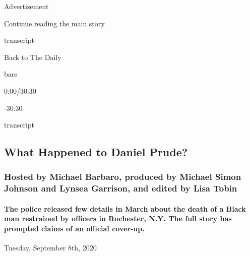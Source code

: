 Advertisement

\protect\hyperlink{after-top}{Continue reading the main story}

transcript

Back to The Daily

bars

0:00/30:30

-30:30

transcript

\hypertarget{what-happened-to-daniel-prude}{%
\subsection{What Happened to Daniel
Prude?}\label{what-happened-to-daniel-prude}}

\hypertarget{hosted-by-michael-barbaro-produced-by-michael-simon-johnson-and-lynsea-garrison-and-edited-by-lisa-tobin}{%
\subsubsection{Hosted by Michael Barbaro, produced by Michael Simon
Johnson and Lynsea Garrison, and edited by Lisa
Tobin}\label{hosted-by-michael-barbaro-produced-by-michael-simon-johnson-and-lynsea-garrison-and-edited-by-lisa-tobin}}

\hypertarget{the-police-released-few-details-in-march-about-the-death-of-a-black-man-restrained-by-officers-in-rochester-ny-the-full-story-has-prompted-claims-of-an-official-cover-up}{%
\paragraph{The police released few details in March about the death of a
Black man restrained by officers in Rochester, N.Y. The full story has
prompted claims of an official
cover-up.}\label{the-police-released-few-details-in-march-about-the-death-of-a-black-man-restrained-by-officers-in-rochester-ny-the-full-story-has-prompted-claims-of-an-official-cover-up}}

Tuesday, September 8th, 2020

